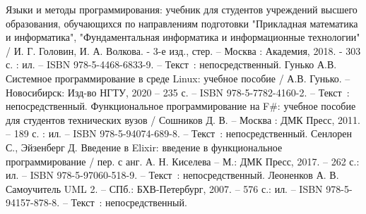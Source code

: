 \begin{thebibliography}{9}
	 Языки и методы программирования: учебник для студентов учреждений высшего образования, обучающихся по направлениям подготовки "Прикладная математика и информатика", "Фундаментальная информатика и информационные технологии" / И. Г. Головин, И. А. Волкова. - 3-е изд., стер. -- Москва : Академия, 2018. - 303 с. : ил. -- ISBN 978-5-4468-6833-9. -- Текст~: непосредственный.
	 Гунько А.В. Системное программирование в среде Linux: учебное пособие / А.В. Гунько. -- Новосибирск: Изд-во НГТУ, 2020 – 235 с. -- ISBN 978-5-7782-4160-2. -- Текст~: непосредственный.
	 Функциональное программирование на F\#: учебное пособие для студентов технических вузов / Сошников Д. В. -- Москва : ДМК Пресс, 2011. -- 189 с. : ил. -- ISBN 978-5-94074-689-8. -- Текст~: непосредственный.
	 Сенлорен С., Эйзенберг Д. Введение в Elixir: введение в функциональное программирование / пер. с анг. А. Н. Киселева -- М.: ДМК Пресс, 2017. -- 262 с.: ил. -- ISBN 978-5-97060-518-9. -- Текст~: непосредственный.
	 Леоненков А. В. Самоучитель UML 2. -- СПб.: БХВ-Петербург, 2007. -- 576 с.: ил. -- ISBN 978-5-94157-878-8. -- Текст~: непосредственный.
\end{thebibliography}
